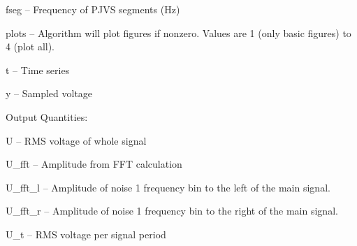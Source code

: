 \begin{tightdesc}
\begin{tightdesc}
\begin{tightdesc}
            \item[\textsf{fseg}] -- Frequency of PJVS segments (Hz)
            \item[\textsf{plots}] -- Algorithm will plot figures if nonzero. Values are 1 (only basic figures) to 4 (plot all).
            \item[\textsf{t}] -- Time series
            \item[\textsf{y}] -- Sampled voltage
        \end{tightdesc}
    \end{tightdesc}
\item [Output Quantities:] \rule{0em}{0em}
    \begin{tightdesc}
        \item[\textsf{U}] -- RMS voltage of whole signal
        \item[\textsf{U\_fft}] -- Amplitude from FFT calculation
        \item[\textsf{U\_fft\_l}] -- Amplitude of noise 1 frequency bin to the left of the main signal.
        \item[\textsf{U\_fft\_r}] -- Amplitude of noise 1 frequency bin to the right of the main signal.
        \item[\textsf{U\_t}] -- RMS voltage per signal period
    \end{tightdesc}
\end{tightdesc}

